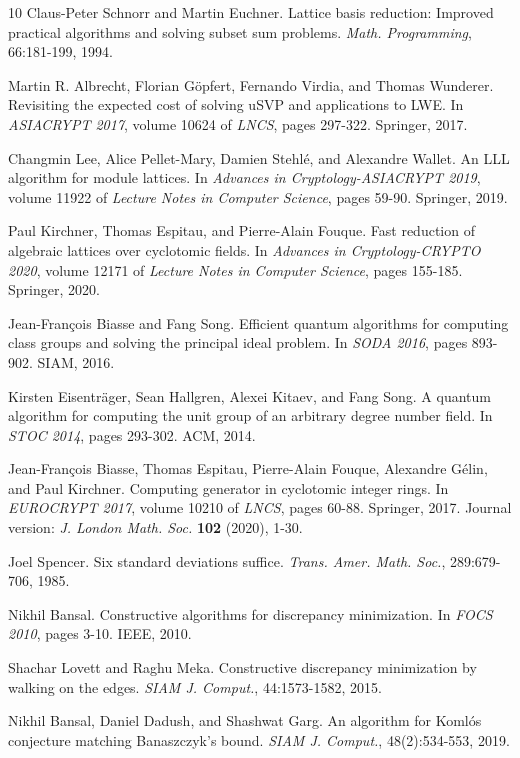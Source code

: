 \documentclass[11pt,a4paper]{article}
\theoremstyle{plain}
\theoremstyle{definition}
\theoremstyle{remark}
\begin{document}
\begin{thebibliography}{10}
Claus-Peter Schnorr and Martin Euchner.
 Lattice basis reduction: Improved practical algorithms and solving subset sum problems.
 {\em Math.  Programming}, 66:181-199, 1994.

Martin R. Albrecht, Florian G\"{o}pfert, Fernando Virdia, and Thomas Wunderer.
 Revisiting the expected cost of solving uSVP and applications to LWE.
 In {\em ASIACRYPT 2017}, volume 10624 of {\em LNCS}, pages 297-322. Springer, 2017.

Changmin Lee, Alice Pellet-Mary, Damien Stehl\'{e}, and Alexandre Wallet.
 An {LLL} algorithm for module lattices.
 In {\em Advances in Cryptology-ASIACRYPT 2019}, volume 11922 of {\em Lecture Notes in Computer Science}, pages 59-90. Springer, 2019.

Paul Kirchner, Thomas Espitau, and Pierre-Alain Fouque.
 Fast reduction of algebraic lattices over cyclotomic fields.
 In {\em Advances in Cryptology-CRYPTO 2020}, volume 12171 of {\em Lecture Notes in Computer Science}, pages 155-185. Springer, 2020.

Jean-Fran\c{c}ois Biasse and Fang Song.
 Efficient quantum algorithms for computing class groups and solving the principal ideal problem.
 In {\em SODA 2016}, pages 893-902. SIAM, 2016.

Kirsten Eisentr\"{a}ger, Sean Hallgren, Alexei Kitaev, and Fang Song.
 A quantum algorithm for computing the unit group of an arbitrary degree number field.
 In {\em STOC 2014}, pages 293-302. ACM, 2014.

Jean-Fran\c{c}ois Biasse, Thomas Espitau, Pierre-Alain Fouque, Alexandre G\'{e}lin, and Paul Kirchner.
 Computing generator in cyclotomic integer rings.
 In {\em EUROCRYPT 2017}, volume 10210 of {\em LNCS}, pages 60-88. Springer, 2017.
 Journal version: \emph{J.  London Math.  Soc.} \textbf{102} (2020), 1-30.

Joel Spencer.
 Six standard deviations suffice.
 {\em Trans.  Amer.  Math.  Soc.}, 289:679-706, 1985.

Nikhil Bansal.
 Constructive algorithms for discrepancy minimization.
 In {\em FOCS 2010}, pages 3-10. IEEE, 2010.

Shachar Lovett and Raghu Meka.
 Constructive discrepancy minimization by walking on the edges.
 {\em SIAM J.  Comput.}, 44:1573-1582, 2015.

Nikhil Bansal, Daniel Dadush, and Shashwat Garg.
 An algorithm for Koml\'{o}s conjecture matching Banaszczyk's bound.
 {\em SIAM J.  Comput.}, 48(2):534-553, 2019.


\end{thebibliography}
\end{document}
